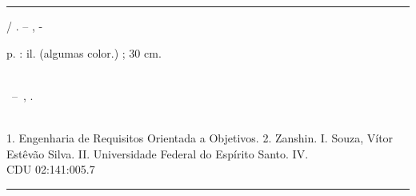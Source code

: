 \documentclass[
	12pt,				%
	openright,			%
	oneside,
	a4paper,			%
	english,			%
	french,				%
	spanish,			%
	brazil				%
	]{abntex2}
\begin{document}
\begin{fichacatalografica}
	\vspace*{\fill}
	\hrule
	\begin{center}
	\begin{minipage}[c]{12.5cm}
	
	\imprimirautor
	
	\hspace{0.5cm} \imprimirtitulo  / \imprimirautor. --
	\imprimirlocal, \imprimirdata-
	
	\hspace{0.5cm} \pageref{LastPage} p. : il. (algumas color.) ; 30 cm.\\
	
	\hspace{0.5cm} \imprimirorientadorRotulo~\imprimirorientador\\
	
	\hspace{0.5cm}
	\parbox[t]{\textwidth}{\imprimirtipotrabalho~--~\imprimirinstituicao,
	\imprimirdata.}\\
	
	\hspace{0.5cm}
		1. Engenharia de Requisitos Orientada a Objetivos.
		2. Zanshin.
		I. Souza, Vítor Estêvão Silva.
		II. Universidade Federal do Espírito Santo.
		IV. \imprimirtitulo \\ 			
	
	\hspace{8.75cm} CDU 02:141:005.7\\
	
	\end{minipage}
	\end{center}
	\hrule
\end{fichacatalografica}



% 
\end{document}

